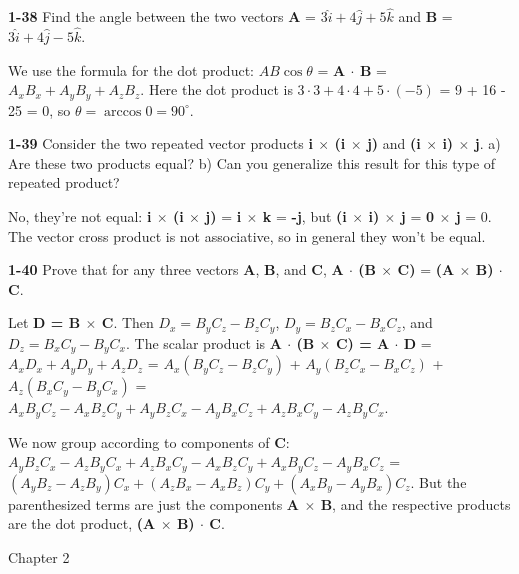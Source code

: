 \documentclass{amsart}
\begin{document}
\vspace{\baselineskip}

\noindent
\textbf{1-38} Find the angle between the two vectors \textbf{A} = $3 \hat i + 4 \hat j + 5 \hat k$
and \textbf{B} = $3 \hat i + 4 \hat j - 5 \hat k$.

We use the formula for the dot product:
$A B \cos \theta$ = \textbf{A $\cdot$ B} = $A_x B_x + A_y B_y + A_z B_z$.
Here the dot product is $3 \cdot 3 + 4 \cdot 4 + 5 \cdot (-5)$ = 9 + 16 - 25 = 0,
so $\theta = \arccos 0 = 90^\circ$.

\vspace{\baselineskip}

\noindent
\textbf{1-39} Consider the two repeated vector products \textbf{i $\times$ (i $\times$ j)}
and \textbf{(i $\times$ i) $\times$ j}.\newline
a) Are these two products equal?\newline
b) Can you generalize this result for this type of repeated product?

No, they're not equal:  \textbf{i $\times$ (i $\times$ j)} =
\textbf{i $\times$ k} = \textbf{-j},
but \textbf{(i $\times$ i) $\times$ j} = \textbf{0 $\times$ j} = 0.
The vector cross product is not associative, so in general they won't be equal.

\vspace{\baselineskip}

\noindent
\textbf{1-40} Prove that for any three vectors \textbf{A}, \textbf{B}, and \textbf{C},
\textbf{A $\cdot$ (B $\times$ C)} = \textbf{(A $\times$ B) $\cdot$ C}.

Let \textbf{D = B $\times$ C}.  Then $D_x = B_y C_z - B_z C_y$, $D_y = B_z C_x - B_x C_z$, and $D_z = B_x C_y - B_y C_x$.
The scalar product is \textbf{A $\cdot$ (B $\times$ C) = A $\cdot$ D} = $A_x D_x + A_y D_y + A_z D_z$ =
$A_x (B_y C_z - B_z C_y)$ + $A_y (B_z C_x - B_x C_z)$ + $A_z (B_x C_y - B_y C_x)$ =
$A_x B_y C_z - A_x B_z C_y + A_y B_z C_x - A_y B_x C_z + A_z B_x C_y - A_z B_y C_x$.

We now group according to components of \textbf{C}:
$A_y B_z C_x - A_z B_y C_x + A_z B_x C_y - A_x B_z C_y + A_x B_y C_z - A_y B_x C_z$ =
$(A_y B_z - A_z B_y) C_x + (A_z B_x - A_x B_z) C_y + (A_x B_y - A_y B_x) C_z$.
But the parenthesized terms are just the components \textbf{A $\times$ B},
and the respective products are the dot product, \textbf{(A $\times$ B) $\cdot$ C}.

\clearpage

Chapter 2
\end{document}
